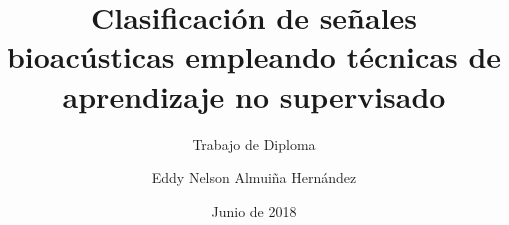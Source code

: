 \title{Clasificación de señales bioacústicas empleando técnicas de aprendizaje no supervisado}

\subtitle{Trabajo de Diploma}

\author{Eddy Nelson Almuiña Hernández}


\date{Junio de 2018}

